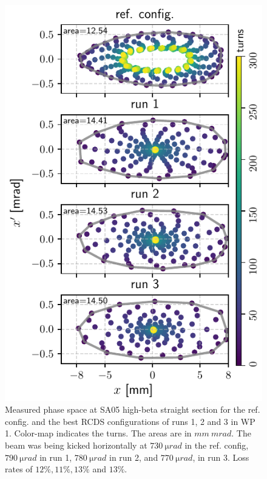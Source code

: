 \begin{figure}[!h]
    \begin{minipage}{0.48\textwidth}
        \centering
        \includegraphics[width=\textwidth]{Images/WEPL087_f2.pdf}
        \caption{Measured phase space at SA05 high-beta straight section for the ref. config. and the best RCDS configurations of runs 1, 2 and 3 in WP 1. Color-map indicates the turns. The areas are in $\unit{mm}~\unit{mrad}$. The beam was being kicked horizontally at $730~\unit{\micro rad}$ in the ref. config, $790~\unit{\micro rad}$ in run 1, $780~\unit{\micro rad}$ in run 2, and $770~\unit{\micro rad}$, in run 3. Loss rates of  $12\%, 11\%, 13\%$ and $13\%$.}
        \label{fig:oldtunes_phase}
    \end{minipage}

\end{figure}
